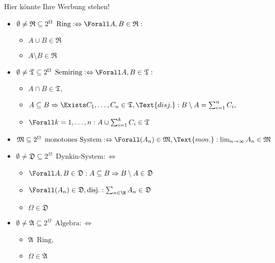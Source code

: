 \begin{solution}

Hier könnte Ihre Werbung stehen!

\begin{itemize}

  \item $\emptyset \neq \mathfrak{R} \subseteq 2^\Omega \enspace \text{Ring} : \Leftrightarrow \Forall A, B \in \mathfrak{R}:$
  \begin{itemize}
    \item $A \cup B \in \mathfrak{R}$
    \item $A \setminus B \in \mathfrak{R}$
  \end{itemize}

  \item $\emptyset \neq \mathfrak{T} \subseteq 2^\Omega \enspace \text{Semiring} : \Leftrightarrow \Forall A, B \in \mathfrak{T}:$
  \begin{itemize}
    \item $A \cap B \in \mathfrak{T},$
    \item $A \subseteq B \Rightarrow \Exists C_1, \ldots, C_n \in \mathfrak{T}, \Text{disj.}:
    B \setminus A = \sum_{i=1}^n C_i,$
    \item $\Forall k = 1, \ldots, n:
    A \cup \sum_{i=1}^k C_i \in \mathfrak{T}$
  \end{itemize}

  \item $\mathfrak{M} \subseteq 2^\Omega \enspace \text{monotones System} : \Leftrightarrow \Forall (A_n) \in \mathfrak{M}, \Text{mon.}: \lim_{n \to \infty} A_n \in \mathfrak{M}$

  \item $\emptyset \neq \mathfrak{D} \subseteq 2^\Omega \enspace \text{Dynkin-System} : \Leftrightarrow$
  \begin{itemize}
    \item $\Forall A, B \in \mathfrak{D}:
    A \subseteq B \Rightarrow B \setminus A \in \mathfrak{D}$
    \item $\Forall (A_n) \in \mathfrak{D}, \text{disj.}: \sum_{n \in \N} A_n \in \mathfrak{D}$
    \item $\Omega \in \mathfrak{D}$
  \end{itemize}

  \item $\emptyset \neq \mathfrak{A} \subseteq 2^\Omega \enspace \text{Algebra} : \Leftrightarrow$
  \begin{itemize}
    \item $\mathfrak{A} \enspace \text{Ring},$
    \item $\Omega \in \mathfrak{A}$
  \end{itemize}


\end{itemize}
\end{solution}
